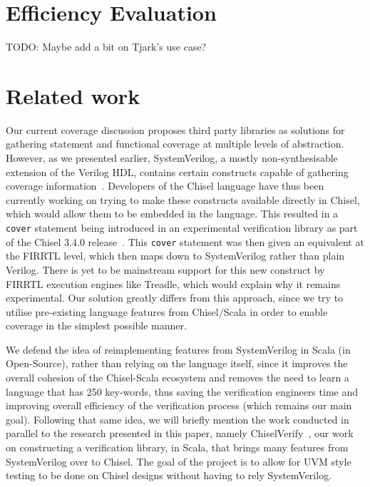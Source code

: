 \documentclass[conference]{IEEEtran}
\newcommand{\todo}[1]{{\color{olive} TODO: #1}}
\begin{document}
\section{Efficiency Evaluation}
\todo{Maybe add a bit on Tjark's use case?}

\section{Related work}
Our current coverage discussion proposes third party libraries  as solutions for gathering statement and functional coverage at multiple levels of abstraction. However, as we presented earlier, SystemVerilog, a mostly non-synthesisable extension of the Verilog HDL, contains certain constructs capable of gathering coverage information~\cite{spear2008systemverilog}. Developers of the Chisel language have thus been currently working on trying to make these constructs available directly in Chisel, which would allow them to be embedded in the language. This resulted in a \texttt{cover} statement being introduced in an experimental verification library as part of the Chisel 3.4.0 release~\cite{chisel3.4release_notes}. This \texttt{cover} statement was then given an equivalent at the FIRRTL level, which then maps down to SystemVerilog rather than plain Verilog. There is yet to be mainstream support for this new construct by FIRRTL execution engines like Treadle, which would explain why it remains experimental. Our solution greatly differs from this approach, since we try to utilise pre-existing language features from Chisel/Scala in order to enable coverage in the simplest possible manner. 

We defend the idea of reimplementing features from SystemVerilog in Scala (in Open-Source), rather than relying on the language itself, since it improves the overall cohesion of the Chisel-Scala ecosystem and removes the need to learn a language that has 250 key-words, thus saving the verification engineers time and improving overall efficiency of the verification process (which remains our main goal). Following that same idea, we will briefly mention the work conducted in parallel to the research presented in this paper, namely ChiselVerify~\cite{chiselverify}, our work on constructing a verification library, in Scala, that brings many features from SystemVerilog over to Chisel. The goal of the project is to allow for UVM style testing to be done on Chisel designs without having to rely SystemVerilog. 
\end{document}
